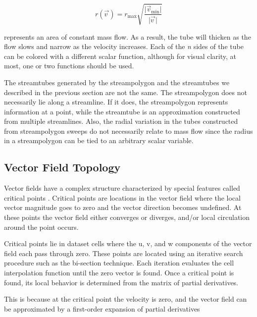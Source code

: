 \begin{equation}\label{eq:9.9}
r(\overrightarrow{v\ }) = r_\text{max} \sqrt{\dfrac{\vert\overrightarrow{v}_\text{min}\vert}{\vert\overrightarrow{v\ }\vert}}
\end{equation}

represents an area of constant mass flow. As a result, the tube will thicken as the flow slows and narrow as the velocity increases. Each of the \emph{n} sides of the tube can be colored with a different scalar function, although for visual clarity, at most, one or two functions should be used.

The streamtubes generated by the streampolygon and the streamtubes we described in the previous section are not the same. The streampolygon does not necessarily lie along a streamline. If it does, the streampolygon represents information at a point, while the streamtube is an approximation constructed from multiple streamlines. Also, the radial variation in the tubes constructed from streampolygon sweeps do not necessarily relate to mass flow since the radius in a streampolygon can be tied to an arbitrary scalar variable.

\subsection{Vector Field Topology}

Vector fields have a complex structure characterized by special features called critical points \cite{Globus91} \cite{Helman91}. Critical points are locations in the vector field where the local vector magnitude goes to zero and the vector direction becomes undefined. At these points the vector field either converges or diverges, and/or local circulation around the point occurs.

Critical points lie in dataset cells where the u, v, and w components of the vector field each pass through zero. These points are located using an iterative search procedure such as the bi-section technique. Each iteration evaluates the cell interpolation function until the zero vector is found. Once a critical point is found, its local behavior is determined from the matrix of partial derivatives.

This is because at the critical point the velocity is zero, and the vector field can be approximated by a first-order expansion of partial derivatives \cite{Helman91}

